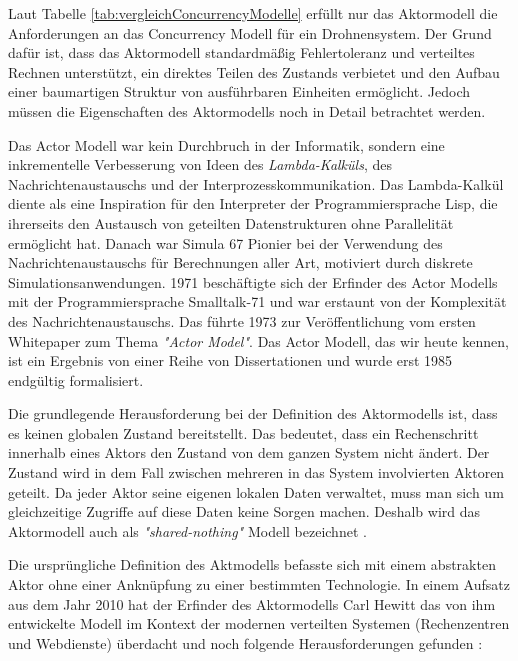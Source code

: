 Laut Tabelle \ref{tab:vergleichConcurrencyModelle} erfüllt nur das Aktormodell die Anforderungen an das Concurrency Modell für ein Drohnensystem. Der Grund dafür ist, dass das Aktormodell standardmäßig Fehlertoleranz und verteiltes Rechnen unterstützt, ein direktes Teilen des Zustands verbietet und den Aufbau einer baumartigen Struktur von ausführbaren Einheiten ermöglicht. Jedoch müssen die Eigenschaften des Aktormodells noch in Detail betrachtet werden.

Das Actor Modell war kein Durchbruch in der Informatik, sondern eine inkrementelle Verbesserung von Ideen des \textit{Lambda-Kalküls}, des Nachrichtenaustauschs und der Interprozesskommunikation. Das Lambda-Kalkül diente als eine Inspiration für den Interpreter der Programmiersprache Lisp, die ihrerseits den Austausch von geteilten Datenstrukturen ohne Parallelität ermöglicht hat. Danach war Simula 67 Pionier bei der Verwendung des Nachrichtenaustauschs für Berechnungen aller Art, motiviert durch diskrete Simulationsanwendungen. 1971 beschäftigte sich der Erfinder des Actor Modells mit der Programmiersprache Smalltalk-71 und war erstaunt von der Komplexität des Nachrichtenaustauschs. Das führte 1973 zur Veröffentlichung vom ersten Whitepaper zum Thema \textit{"Actor Model"}. Das Actor Modell, das wir heute kennen, ist ein Ergebnis von einer Reihe von Dissertationen und wurde erst 1985 endgültig formalisiert.

Die grundlegende Herausforderung bei der Definition des Aktormodells ist, dass es keinen globalen Zustand bereitstellt. Das bedeutet, dass ein Rechenschritt innerhalb eines Aktors den Zustand von dem ganzen System  nicht ändert. Der Zustand wird in dem Fall zwischen mehreren in das System involvierten Aktoren geteilt. Da jeder Aktor seine eigenen lokalen Daten verwaltet, muss man sich um gleichzeitige Zugriffe auf diese Daten keine Sorgen machen. Deshalb wird das Aktormodell auch als \textit{"shared-nothing"} Modell bezeichnet \cite{Hewitt_artificialintelligence}.

Die ursprüngliche Definition des Aktmodells befasste sich mit einem abstrakten Aktor ohne einer Anknüpfung zu einer bestimmten Technologie. In einem Aufsatz aus dem Jahr 2010 hat der Erfinder des Aktormodells Carl Hewitt das von ihm entwickelte Modell im Kontext der modernen verteilten Systemen (Rechenzentren und Webdienste) überdacht und noch folgende Herausforderungen gefunden \cite{hewitt2015actor}:

